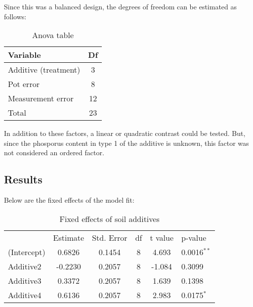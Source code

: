 \documentclass[11pt,a4paper]{article}
\begin{document}
Since this was a balanced design, the degrees of freedom can be estimated as follows:
\begin{table}[H]
\centering
\begin{tabular}{lc}
  \hline
  Variable & Df \\ 
  \hline
  Additive (treatment) & 3 \\ 
  Pot error & 8 \\ 
  Measurement error & 12 \\
  \hline
  Total & 23\\
  \hline
\end{tabular}
\caption{Anova table}
\end{table}

In addition to these factors, a linear or quadratic contrast could be tested. But, since the phosporus content in type 1 of the additive is unknown, this factor was not considered an ordered factor. 

\subsection*{Results}
Below are the fixed effects of the model fit:
\begin{table}[H]
\centering
\begin{tabular}{lccccl}
\hline
            & Estimate & Std. Error & df & t value & p-value \\
(Intercept) & 0.6826   & 0.1454     & 8  & 4.693   & 0.0016$^{**}$ \\
Additive2   & -0.2230  & 0.2057     & 8  & -1.084  & 0.3099 \\
Additive3   & 0.3372   & 0.2057     & 8  & 1.639   & 0.1398 \\
Additive4   & 0.6136   & 0.2057     & 8  & 2.983   & 0.0175$^{*}$ \\ 
\hline
\end{tabular}
\caption{Fixed effects of soil additives}
\label{tab:Tab2_2}
\end{table}
\end{document}
